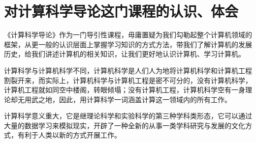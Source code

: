 \documentclass{article}
\begin{document}
\section{对计算科学导论这门课程的认识、体会}
《计算科学导论》作为一门导引性课程，毋庸置疑为我们勾勒起整个计算机领域的框架，从更一般的认识层面上掌握学习知识的方式方法，带我们了解计算机的发展历史，给我们讲述计算机的相关知识，让我们更好地认识计算机、学习计算机。\par
计算科学与计算机科学不同，计算机科学是人们人为地将计算机科学和计算机工程割裂开来，而实际上，计算机科学与计算机工程是密不可分的，没有计算机科学，计算机工程就如同空中楼阁，转眼倾塌；没有计算机工程，计算机科学空有一身理论却无用武之地，因此，用计算科学一词涵盖计算这一领域内的所有工作。\par
计算科学意义重大，它是继理论科学和实验科学的第三种学科类形态，它可以通过大量的数据学习来模拟现实，开辟了一种全新的从事一类学科研究与发展的文化方式，有利于人类以新的方式开展工作。\par
\end{document}
